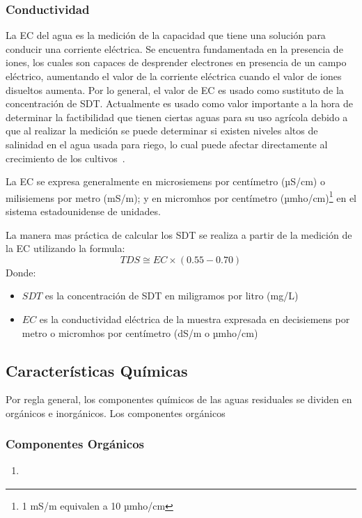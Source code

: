 \subsubsection{Conductividad}
La \gls{EC} del agua es la medición de la capacidad que tiene una solución para conducir una corriente eléctrica. Se encuentra fundamentada en la presencia de iones, los cuales son capaces de desprender electrones en presencia de un campo eléctrico, aumentando el valor de la corriente eléctrica cuando el valor de iones disueltos aumenta. Por lo general, el valor de EC es usado como sustituto de la concentración de SDT. Actualmente es usado como valor importante a la hora de determinar la factibilidad que tienen ciertas aguas para su uso agrícola debido a que al realizar la medición se puede determinar si existen niveles altos de salinidad en el agua usada para riego, lo cual puede afectar directamente al crecimiento de los cultivos~\citep{metcalf2003}.\par
La EC se expresa generalmente en microsiemens por centímetro (µS/cm) o milisiemens por metro (mS/m); y en micromhos por centímetro (µmho/cm)\footnote{1 mS/m equivalen a 10 µmho/cm} en el sistema estadounidense de unidades.\par
La manera mas práctica de calcular los \gls{SDT} se realiza a partir de la medición de la \gls{EC} utilizando la formula:
\begin{equation*}
	TDS \cong EC \times (0.55 - 0.70)
\end{equation*}
Donde:
\begin{itemize}
	\item $SDT$ es la concentración de \acrlong{SDT} en miligramos por litro (mg/L)
	\item $EC$ es la conductividad eléctrica de la muestra expresada en decisiemens por metro o micromhos por centímetro (dS/m o µmho/cm)
\end{itemize}
\subsection{Características Químicas}
Por regla general, los componentes químicos de las aguas residuales se dividen en orgánicos e inorgánicos. Los componentes orgánicos 
\subsubsection{Componentes Orgánicos}
\begin{enumerate}[label=\textbf{\alph*{.-}}]
	\item \textbf{}\par
\end{enumerate}
